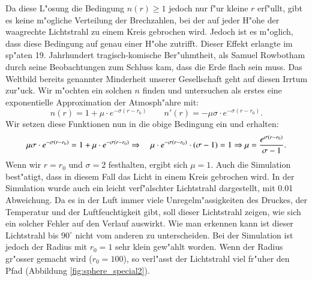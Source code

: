 \begin{refsection}
Da diese L"osung die Bedingung $n(r) \geq 1$ jedoch nur f"ur kleine $r$ erf"ullt, gibt es keine m"ogliche Verteilung der Brechzahlen, bei der auf jeder H"ohe der waagrechte Lichtstrahl zu einem Kreis gebrochen wird. 
Jedoch ist es m"oglich, dass diese Bedingung auf genau einer H"ohe zutrifft. 
Dieser Effekt erlangte im sp"aten 19. Jahrhundert tragisch-komische Ber"uhmtheit, als Samuel Rowbotham durch seine Beobachtungen zum Schluss kam, dass die Erde flach sein muss. 
Das Weltbild bereits genannter Minderheit\cite{licht:flatearthsociety} unserer Gesellschaft geht auf diesen Irrtum zur"uck.
Wir m"ochten ein solchen $n$ finden und untersuchen als erstes eine exponentielle Approximation der Atmosph"ahre mit:
$$n(r) = 1 + \mu \cdot e^{-\sigma (r-r_0)} \qquad n'(r) = -\mu \sigma \cdot e^{-\sigma (r-r_0)}.$$
Wir setzen diese Funktionen nun in die obige Bedingung ein und erhalten:
$$\mu \sigma \cdot e^{-\sigma (r-r_0)} = 1 + \mu \cdot e^{-\sigma (r-r_0)} \quad \\
\Rightarrow \quad \mu \cdot e^{-\sigma (r-r_0)} \cdot (\sigma - 1) = 1 \\
\Rightarrow \mu = \frac{e^{\sigma (r-r_0)}}{\sigma - 1}.$$
Wenn wir $r = r_0$ und $\sigma = 2$ festhalten, ergibt sich $\mu = 1$. 
Auch die Simulation best"atigt, dass in diesem Fall das Licht in einem Kreis gebrochen wird.
In der Simulation wurde auch ein leicht verf"alschter Lichtstrahl dargestellt, mit 0.01 Abweichung. 
Da es in der Luft immer viele Unregelm"assigkeiten des Druckes, der Temperatur und der Luftfeuchtigkeit gibt, soll dieser Lichtstrahl zeigen, wie sich ein solcher Fehler auf den Verlauf auswirkt.
Wie man erkennen kann ist dieser Lichtstrahl bis $90^\circ$ nicht vom anderen zu unterscheiden.
Bei der Simulation ist jedoch der Radius mit $r_0=1$ sehr klein gew"ahlt worden. 
Wenn der Radius gr"osser gemacht wird ($r_0 = 100$), so  verl"asst der Lichtstrahl viel fr"uher den Pfad (Abbildung \ref{fig:sphere_special2}). 


\end{refsection}
